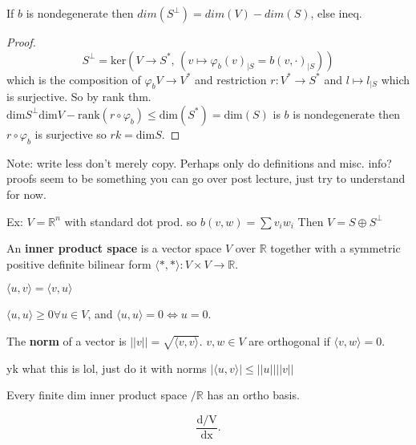 \documentclass{article}
\begin{document}
\begin{lemma}
  If \( b \) is nondegenerate then \( dim(S^{\perp})=dim(V)-dim(S) \), else ineq. 
\end{lemma}

\begin{proof}
  
  \begin{displaymath}
    S^{\perp}=      \text{ker} \left( V \to  S^*, \, (v \mapsto \varphi _b(v)_{\mid S} =b(v,\cdot)_{\mid S}) \right)
  \end{displaymath}
  which is the composition of \( \varphi _b V \to  V^* \) and restriction \( r: V^* \to  S^* \) and \( l\mapsto l_{\mid S} \) which is surjective. So by rank thm. \( \text{dim}S^{\perp} \text{dim}V-\text{rank}(r \circ \varphi _b ) \le \text{dim}(S^*)=\text{dim}(S) \) is \( b  \) is nondegenerate then \( r \circ \varphi _b \) is surjective so \( rk=\text{dim}S \).
\end{proof}


Note: write less don't merely copy. Perhaps only do definitions and misc. info? proofs seem to be something you can go over post lecture, just try to understand for now. 


Ex: \( V=\mathbb{R}^n \) with standard dot prod. so \( b(v,w) = \sum v_i w_i \) Then \( V= S \oplus S^\perp \)


\begin{definition}
  An \textbf{inner product space} is a vector space \( V \) over \( \mathbb{R} \) together with a symmetric positive definite bilinear form \( \langle *,*\rangle: V \times V \to  \mathbb{R} \).
\end{definition}

\begin{definition}
  \( \langle u,v \rangle =\langle v,u \rangle \)
\end{definition}

\begin{definition}
  \( \langle u,u \rangle \ge  0 \forall u \in  V \), and \( \langle u,u \rangle=0 \iff u=0 \).
\end{definition}

\begin{definition}[norm]
  The \textbf{norm} of a vector is \( | | v | | = \sqrt{\langle v,v\rangle}  \). \(v,w \in V \) are orthogonal if \( \langle v,w \rangle =0 \). 
\end{definition}

\begin{theorem}
  yk what this is lol, just do it with norms \( |\langle u , v \rangle | \le | | u | | | | v | | \)
\end{theorem}

\begin{theorem}
  Every finite dim inner product space \( / \mathbb{R} \) has an ortho basis.
\end{theorem}

\[
  \frac{\mathrm{d/V}}{\mathrm{dx}} 
.\] 
\end{document}
